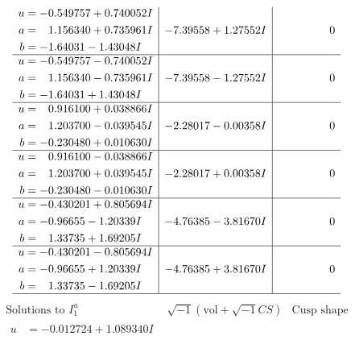 \documentclass[1p]{elsarticle_modified}
\theoremstyle{definition}
\newcommand{\I}{\sqrt{-1}}
\begin{document}
$$\begin{array}{c|c|c}
\begin{aligned}
u &= -0.549757 + 0.740052 I \\
a &= \phantom{-}1.156340 + 0.735961 I \\
b &= -1.64031 - 1.43048 I\end{aligned}
 & -7.39558 + 1.27552 I & \phantom{-0.000000 } 0 \\ \hline\begin{aligned}
u &= -0.549757 - 0.740052 I \\
a &= \phantom{-}1.156340 - 0.735961 I \\
b &= -1.64031 + 1.43048 I\end{aligned}
 & -7.39558 - 1.27552 I & \phantom{-0.000000 } 0 \\ \hline\begin{aligned}
u &= \phantom{-}0.916100 + 0.038866 I \\
a &= \phantom{-}1.203700 - 0.039545 I \\
b &= -0.230480 + 0.010630 I\end{aligned}
 & -2.28017 - 0.00358 I & \phantom{-0.000000 } 0 \\ \hline\begin{aligned}
u &= \phantom{-}0.916100 - 0.038866 I \\
a &= \phantom{-}1.203700 + 0.039545 I \\
b &= -0.230480 - 0.010630 I\end{aligned}
 & -2.28017 + 0.00358 I & \phantom{-0.000000 } 0 \\ \hline\begin{aligned}
u &= -0.430201 + 0.805694 I \\
a &= -0.96655 - 1.20339 I \\
b &= \phantom{-}1.33735 + 1.69205 I\end{aligned}
 & -4.76385 - 3.81670 I & \phantom{-0.000000 } 0 \\ \hline\begin{aligned}
u &= -0.430201 - 0.805694 I \\
a &= -0.96655 + 1.20339 I \\
b &= \phantom{-}1.33735 - 1.69205 I\end{aligned}
 & -4.76385 + 3.81670 I & \phantom{-0.000000 } 0\\
 \hline 
 \end{array}$$\newpage$$\begin{array}{c|c|c}  
\text{Solutions to }I^u_{1}& \I (\text{vol} + \sqrt{-1}CS) & \text{Cusp shape}\\
 \hline 
\begin{aligned}
u &= -0.012724 + 1.089340 I \\

\end{aligned}
\end{array}$$
\end{document}
